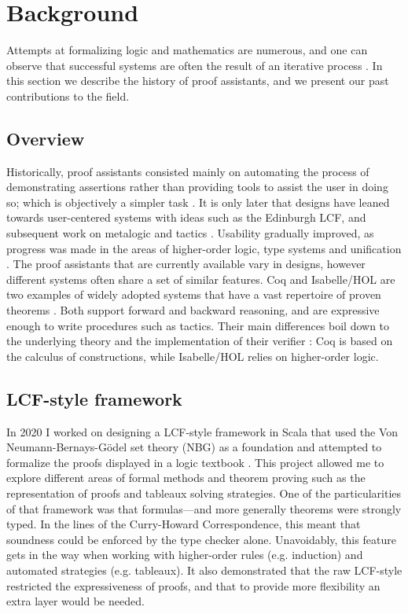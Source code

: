 \section{Background}
\label{sec:background}

Attempts at formalizing logic and mathematics are numerous, and one can observe that successful systems are often the result of an iterative process \cite{Paulson2019, Harrison2014, Asperti2007}. In this section we describe the history of proof assistants, and we present our past contributions to the field.

\subsection{Overview}

Historically, proof assistants consisted mainly on automating the process of demonstrating assertions rather than providing tools to assist the user in doing so; which is objectively a simpler task \cite{Harrison2014}. It is only later that designs have leaned towards user-centered systems with ideas such as the Edinburgh LCF, and subsequent work on metalogic and tactics \cite{Milner1984}. Usability gradually improved, as progress was made in the areas of higher-order logic, type systems and unification \cite{Paulson2019}. The proof assistants that are currently available vary in designs, however different systems often share a set of similar features. Coq and Isabelle/HOL are two examples of widely adopted systems that have a vast repertoire of proven theorems \cite{Yushkovskiy2018}. Both support forward and backward reasoning, and are expressive enough to write procedures such as tactics. Their main differences boil down to the underlying theory and the implementation of their verifier \cite{Barras1999, Wenzel2021}: Coq is based on the calculus of constructions, while Isabelle/HOL relies on higher-order logic.

\subsection{LCF-style framework}

In 2020 I worked on designing a LCF-style framework in Scala that used the Von Neumann-Bernays-Gödel set theory (NBG) as a foundation \cite{Cassayre2020} and attempted to formalize the proofs displayed in a logic textbook \cite{Mendelson2015}. This project allowed me to explore different areas of formal methods and theorem proving such as the representation of proofs and tableaux solving strategies. One of the particularities of that framework was that formulas---and more generally theorems were strongly typed. In the lines of the Curry-Howard Correspondence, this meant that soundness could be enforced by the type checker alone. Unavoidably, this feature gets in the way when working with higher-order rules (e.g. induction) and automated strategies (e.g. tableaux). It also demonstrated that the raw LCF-style restricted the expressiveness of proofs, and that to provide more flexibility an extra layer would be needed.

